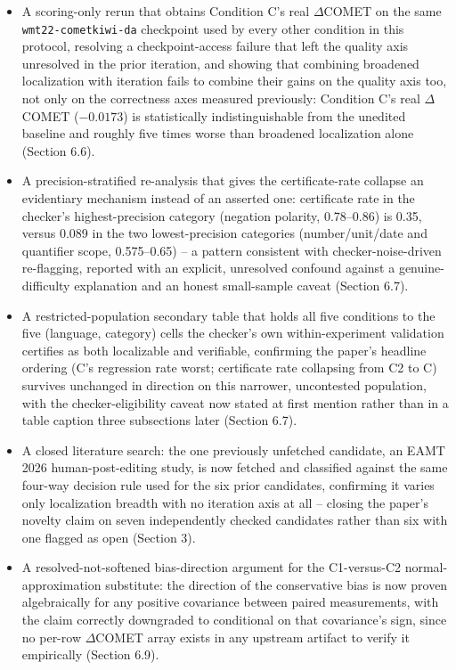 \documentclass[11pt,letterpaper]{article}
\begin{document}
\begin{itemize}
\item A scoring-only rerun that obtains Condition C's real $\Delta$COMET on the same \texttt{wmt22-cometkiwi-da} checkpoint used by every other condition in this protocol, resolving a checkpoint-access failure that left the quality axis unresolved in the prior iteration, and showing that combining broadened localization with iteration fails to combine their gains on the quality axis too, not only on the correctness axes measured previously: Condition C's real $\Delta$COMET ($-0.0173$) is statistically indistinguishable from the unedited baseline and roughly five times worse than broadened localization alone (Section 6.6).
\item A precision-stratified re-analysis that gives the certificate-rate collapse an evidentiary mechanism instead of an asserted one: certificate rate in the checker's highest-precision category (negation polarity, 0.78--0.86) is 0.35, versus 0.089 in the two lowest-precision categories (number/unit/date and quantifier scope, 0.575--0.65) -- a pattern consistent with checker-noise-driven re-flagging, reported with an explicit, unresolved confound against a genuine-difficulty explanation and an honest small-sample caveat (Section 6.7).
\item A restricted-population secondary table that holds all five conditions to the five (language, category) cells the checker's own within-experiment validation certifies as both localizable and verifiable, confirming the paper's headline ordering (C's regression rate worst; certificate rate collapsing from C2 to C) survives unchanged in direction on this narrower, uncontested population, with the checker-eligibility caveat now stated at first mention rather than in a table caption three subsections later (Section 6.7).
\item A closed literature search: the one previously unfetched candidate, an EAMT 2026 human-post-editing study, is now fetched and classified against the same four-way decision rule used for the six prior candidates, confirming it varies only localization breadth with no iteration axis at all -- closing the paper's novelty claim on seven independently checked candidates rather than six with one flagged as open (Section 3).
\item A resolved-not-softened bias-direction argument for the C1-versus-C2 normal-approximation substitute: the direction of the conservative bias is now proven algebraically for any positive covariance between paired measurements, with the claim correctly downgraded to conditional on that covariance's sign, since no per-row $\Delta$COMET array exists in any upstream artifact to verify it empirically (Section 6.9).
\end{itemize}
\end{document}
